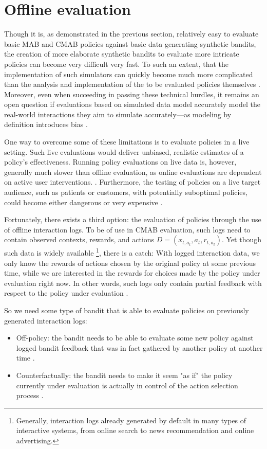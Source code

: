 \documentclass{jss}
\begin{document}
\section{Offline evaluation} \label{offl}

Though it is, as demonstrated in the previous section, relatively easy to evaluate basic MAB and CMAB policies against basic data generating synthetic bandits, the creation of more elaborate synthetic bandits to evaluate more intricate policies can become very difficult very fast. To such an extent, that the implementation of such simulators can quickly become much more complicated than the analysis and implementation of the to be evaluated policies themselves \citep{Strehl2006a}. Moreover, even when succeeding in passing these technical hurdles, it remains an open question if evaluations based on simulated data model accurately model the real-world interactions they aim to simulate accurately---as modeling by definition introduces bias \citep{Li2012,Li2011}.

One way to overcome some of these limitations is to evaluate policies in a live setting. Such live evaluations would deliver unbiased, realistic estimates of a policy's effectiveness. Running policy evaluations on live data is, however, generally much slower than offline evaluation, as online evaluations are dependent on active user interventions. \citep{Mandel2016, Tewari2017}. Furthermore, the testing of policies on a live target audience, such as patients or customers, with potentially suboptimal policies, could become either dangerous or very expensive \citep{Bastani2015}.

Fortunately, there exists a third option: the evaluation of policies through the use of offline interaction logs. To be of use in CMAB evaluation, such logs need to contain observed contexts, rewards, and actions \( D = (x_{t,a_t},a_{t},r_{t,a_t})\). Yet though such data is widely available \footnote{Generally, interaction logs already generated by default in many types of interactive systems, from online search to news recommendation and online advertising.}, there is a catch: With logged interaction data, we only know the rewards of actions chosen by the original policy at some previous time, while we are interested in the rewards for choices made by the policy under evaluation right now. In other words, such logs only contain partial feedback with respect to the policy under evaluation \citep{Strehl2010}.

So we need some type of bandit that is able to evaluate policies on previously generated interaction logs:
\begin{itemize}
   \item{Off-policy: the bandit needs to be able to evaluate some new policy against logged bandit feedback that was in fact gathered by another policy at another time \citep{Li2012,Li2011}.
   }
   \item{Counterfactually: the bandit needs to make it seem "as if" the policy currently under evaluation is actually in control of the action selection process \citep{Bottou2013,Swaminathan2015}.}
\end{itemize}
\end{document}
